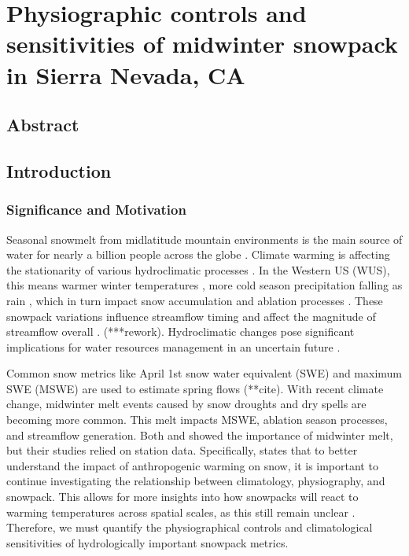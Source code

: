 \hypertarget{ch2}{%
\chapter{Physiographic controls and sensitivities of midwinter snowpack in Sierra Nevada, CA}\label{ch2}}

\hypertarget{ch2-abstract}{\section{Abstract}\label{ch2-abstract}}

\hypertarget{ch2-intro}{\section{Introduction}\label{ch2-intro}}
\subsection{Significance and Motivation}
Seasonal snowmelt from midlatitude mountain environments is the main source of water for nearly a billion people across the globe \citep{sturmWaterLifeSnow2017}.
Climate warming is affecting the stationarity of various hydroclimatic processes \citep{millyStationarityDeadWhither2008}. In the Western US (WUS), this means warmer winter temperatures \cite{gergelEffectsClimateChange2017}, more cold season precipitation falling as rain \citep{knowlesTrendsSnowfallRainfall2006}, which in turn impact snow accumulation and ablation processes \citep{kapnickCausesRecentChanges2012}. These snowpack variations influence streamflow timing \citep{stewartChangesSnowmeltRunoff2004} and affect the magnitude of streamflow overall \citep{barnhartSnowmeltRateDictates2016}. (***rework). Hydroclimatic changes pose significant implications for water resources management in an uncertain future \citep{livnehDroughtLessPredictable2020}.

Common snow metrics like April 1st snow water equivalent (SWE) and maximum SWE (MSWE) are used to estimate spring flows (**cite). With recent climate change, midwinter melt events caused by snow droughts \citep{harpoldDefiningSnowDrought2017} and dry spells \citep{hatchettMidwinterDrySpells2023} are becoming more common. This melt impacts MSWE, ablation season processes, and streamflow generation. Both \cite{harpoldHumidityDeterminesSnowpack2018} and \cite{musselmanWinterMeltTrends2021} showed the importance of midwinter melt, but their studies relied on station data. Specifically, \cite{musselmanWinterMeltTrends2021} states that to better understand the impact of anthropogenic warming on snow, it is important to continue investigating the relationship between climatology, physiography, and snowpack. This allows for more insights into how snowpacks will react to warming temperatures across spatial scales, as this still remain unclear \citep{molotchEstimatingDistributionSnow2008}. Therefore, we must quantify the physiographical controls and climatological sensitivities of hydrologically important snowpack metrics.

